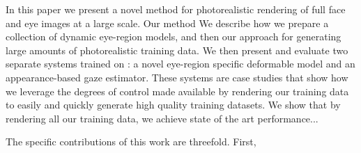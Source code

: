 

In this paper we present a novel method for photorealistic rendering of full face and eye images at a large scale.
Our method 
We describe how we prepare a collection of dynamic eye-region models, and then our approach for generating large amounts of photorealistic training data.
We then present and evaluate two separate systems trained on \dataset: a novel eye-region specific deformable model and an appearance-based gaze estimator.
These systems are case studies that show how we leverage the degrees of control made available by rendering our training data to easily and quickly generate high quality training datasets.
We show that by rendering all our training data, we achieve state of the art performance...

The specific contributions of this work are threefold. First, 

